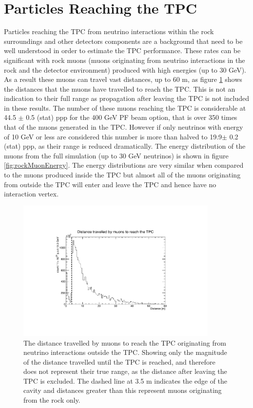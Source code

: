 \section{Particles Reaching the TPC}
Particles reaching the TPC from neutrino interactions within the rock surroundings and other detectors components are a background that need to be well understood in order to estimate the TPC performance. These rates can be significant with rock muons (muons originating from neutrino interactions in the rock and the detector environment) produced with high energies (up to 30 GeV). As a result these muons can travel vast distances, up to 60 m, as figure \ref{fig:rockMuonsRange} shows the distances that the muons have travelled to reach the TPC. This is not an indication to their full range as propagation after leaving the TPC is not included in these results. The number of these muons reaching the TPC is considerable at 44.5 $\pm$ 0.5 (stat) ppp for the 400 GeV PF beam option, that is over 350 times that of the muons generated in the TPC. However if only neutrinos with energy of 10 GeV or less are considered this number is more than halved to 19.9$\pm$ 0.2 (stat) ppp, as their range is reduced dramatically. The energy distribution of the muons from the full simulation (up to 30 GeV neutrinos) is shown in figure \ref{fig:rockMuonEnergy}. The energy distributions are very similar when compared to the muons produced inside the TPC but almost all of the muons originating from outside the TPC will enter and leave the TPC and hence have no interaction vertex. 
\begin{figure}[htbp]
\begin{center}
  	\includegraphics[width=100mm]{Chapter4/figures/rockMuonRange.pdf}
	\caption{The distance travelled by muons to reach the TPC originating from neutrino interactions outside the TPC. Showing only the magnitude of the distance travelled until the TPC is reached, and therefore does not represent their true range, as the distance after leaving the TPC is excluded. The dashed line at 3.5 m indicates the edge of the cavity and distances greater than this represent muons originating from the rock only.}
	\label{fig:rockMuonsRange}
\end{center}
\end{figure}
